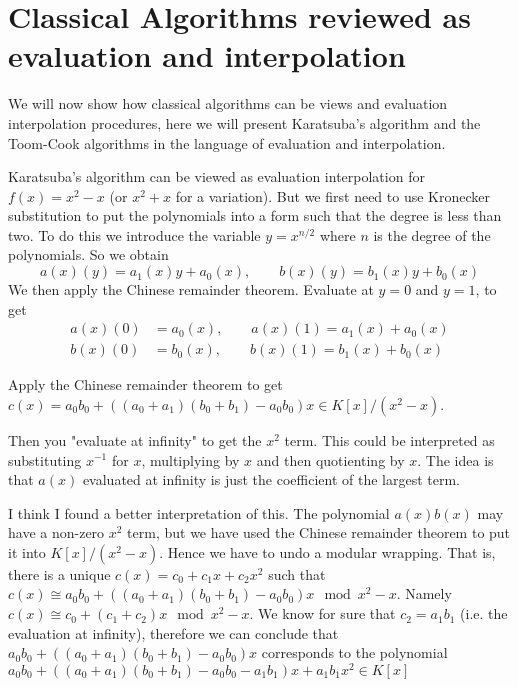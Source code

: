 \section{Classical Algorithms reviewed as evaluation and interpolation}%
\label{sec:classical_algorithms_reviewed_as_evaluation_and_interpolation}

We will now show how classical algorithms can be views and evaluation interpolation procedures, here we will present Karatsuba's algorithm and the Toom-Cook algorithms in the language of evaluation and interpolation.

Karatsuba's algorithm can be viewed as evaluation interpolation for $f(x) = x^2 - x$ (or $x^2 + x$ for a variation). But we first need to use Kronecker substitution to put the polynomials into a form such that the degree is less than two. To do this we introduce the variable $y = x^{n/2}$ where $n$ is the degree of the polynomials. So we obtain
\[
    a(x)(y) = a_1(x)y + a_0(x), \qquad b(x)(y) = b_1(x)y + b_0(x)
\]
We then apply the Chinese remainder theorem. Evaluate at $y = 0$ and $y = 1$, to get
\begin{align*}
    a(x)(0) &= a_0(x), \qquad a(x)(1) = a_1(x) + a_0(x)\\
    b(x)(0) &= b_0(x), \qquad b(x)(1) = b_1(x) + b_0(x)
\end{align*}

Apply the Chinese remainder theorem to get $c(x) = a_0b_0 + ((a_0 + a_1)(b_0 + b_1) - a_0b_0)x \in K[x]/(x^2 - x)$. 

Then you "evaluate at infinity" to get the $x^2$ term. This could be interpreted as substituting $x^{-1}$ for $x$, multiplying by $x$ and then quotienting by $x$. The idea is that $a(x)$ evaluated at infinity is just the coefficient of the largest term. 

I think I found a better interpretation of this. The polynomial $a(x)b(x)$ may have a non-zero $x^2$ term, but we have used the Chinese remainder theorem to put it into $K[x] / (x^2 - x)$. Hence we have to undo a modular wrapping. That is, there is a unique $c(x) = c_0 + c_1x + c_2x^2$ such that $c(x) \cong a_0b_0 + ((a_0 + a_1)(b_0 + b_1) - a_0b_0)x \mod x^2 - x$. Namely $c(x) \cong c_0 + (c_1 + c_2)x \mod x^2 - x$. We know for sure that $c_2 = a_1b_1$ (i.e. the evaluation at infinity), therefore we can conclude that $a_0b_0 + ((a_0 + a_1)(b_0 + b_1) - a_0b_0)x$ corresponds to the polynomial $a_0b_0 + ((a_0 + a_1)(b_0 + b_1) - a_0b_0 - a_1b_1)x + a_1b_1x^2 \in K[x]$

